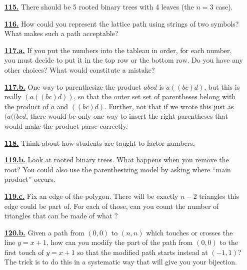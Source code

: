 \documentclass[10pt,]{book}
\theoremstyle{plain}
\theoremstyle{definition}
\theoremstyle{definition}
\theoremstyle{definition}
\numberwithin{equation}{chapter}
\begin{document}
\begin{itemize}[itemsep=1em]
\hypertarget{a-115}{}\item[\textbf{\hyperref[act-rootedtrees]{115.}}]
\hypertarget{p-574}{}%
There should be 5 rooted binary trees with 4 leaves (the \(n = 3\) case).%

\hypertarget{a-116}{}\item[\textbf{\hyperref[act-pathshdseq]{116.}}]
\hypertarget{p-579}{}%
How could you represent the lattice path using strings of two symbols?  What makes such a path acceptable?%

\hypertarget{a-117.a}{}\item[\textbf{\hyperref[task-118]{117.a.}}]
\hypertarget{p-583}{}%
If you put the numbers into the tableau in order, for each number, you must decide to put it in the top row or the bottom row.  Do you have any other choices?  What would constitute a mistake?%

\hypertarget{a-117.b}{}\item[\textbf{\hyperref[task-119]{117.b.}}]
\hypertarget{p-585}{}%
One way to parenthesize the product \(abcd\) is \(a((bc)d)\), but this is really \((a((bc)d))\), so that the outer set set of parentheses belong with the product of \(a\) and \(((bc)d)\).  Further, not that if we wrote this just as \((a((bcd\), there would be only one way to insert the right parentheses that would make the product parse correctly.%

\hypertarget{a-118}{}\item[\textbf{\hyperref[activity-118]{118.}}]
\hypertarget{p-588}{}%
Think about how students are taught to factor numbers.%

\hypertarget{a-119.b}{}\item[\textbf{\hyperref[task-121]{119.b.}}]
\hypertarget{p-594}{}%
Look at rooted binary trees.  What happens when you remove the root?  You could also use the parenthesizing model by asking where ``main product'' occurs.%

\hypertarget{a-119.c}{}\item[\textbf{\hyperref[task-122]{119.c.}}]
\hypertarget{p-599}{}%
Fix an edge of the polygon.  There will be exactly \(n-2\) triangles this edge could be part of.  For each of those, can you count the number of triangles that can be made of what ?%

\hypertarget{a-120.b}{}\item[\textbf{\hyperref[task-124]{120.b.}}]
\hypertarget{p-606}{}%
Given a path from \((0, 0)\) to \((n, n)\) which touches or crosses the line \(y = x + 1\), how can you modify the part of the path from \((0, 0)\) to the first touch of \(y = x + 1\) so that the modified path starts instead at \((-1, 1)\)? The trick is to do this in a systematic way that will give you your bijection.%


\end{itemize}
\end{document}
